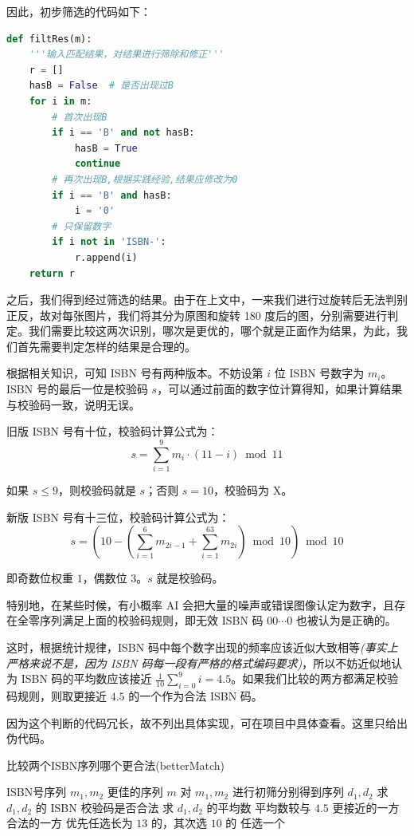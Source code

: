 \documentclass{ctexart}
\begin{document}
因此，初步筛选的代码如下：
\begin{lstlisting}[language=python]
def filtRes(m):
    '''输入匹配结果，对结果进行筛除和修正'''
    r = []
    hasB = False  # 是否出现过B
    for i in m:
        # 首次出现B
        if i == 'B' and not hasB:
            hasB = True
            continue
        # 再次出现B,根据实践经验,结果应修改为0
        if i == 'B' and hasB:
            i = '0'
        # 只保留数字
        if i not in 'ISBN-':
            r.append(i)
    return r
\end{lstlisting}

之后，我们得到经过筛选的结果。由于在上文中，一来我们进行过旋转后无法判别正反，故对每张图片，我们将其分为原图和旋转 180 度后的图，分别需要进行判定。我们需要比较这两次识别，哪次是更优的，哪个就是正面作为结果，为此，我们首先需要判定怎样的结果是合理的。

根据相关知识，可知 ISBN 号有两种版本。不妨设第 $i$ 位 ISBN 号数字为 $m_i$。ISBN 号的最后一位是校验码 $s$，可以通过前面的数字位计算得知，如果计算结果与校验码一致，说明无误。

旧版 ISBN 号有十位，校验码计算公式为：
\[s=\sum_{i=1}^9m_i\cdot(11-i)\bmod{11}\]

如果 $s\le 9$，则校验码就是 $s$；否则 $s=10$，校验码为 X。

新版 ISBN 号有十三位，校验码计算公式为：
\[s=(10-(\sum_{i=1}^6m_{2i-1}+\sum_{i=1}^63m_{2i})\bmod 10)\bmod{10}\]

即奇数位权重 $1$，偶数位 $3$。$s$ 就是校验码。

特别地，在某些时候，有小概率 AI 会把大量的噪声或错误图像认定为数字，且存在全零序列满足上面的校验码规则，即无效 ISBN 码 $00\cdots 0$ 也被认为是正确的。

这时，根据统计规律，ISBN 码中每个数字出现的频率应该近似大致相等\textit{(事实上严格来说不是，因为 ISBN 码每一段有严格的格式编码要求)}，所以不妨近似地认为 ISBN 码的平均数应该接近 $\frac{1}{10}\sum_{i=0}^9i=4.5$。如果我们比较的两方都满足校验码规则，则取更接近 $4.5$ 的一个作为合法 ISBN 码。

因为这个判断的代码冗长，故不列出具体实现，可在项目中具体查看。这里只给出伪代码。
\begin{algorithm}
    \caption{比较两个ISBN序列哪个更合法(betterMatch)}
    \label{betterMatch}
    \renewcommand{\algorithmicrequire}{\textbf{输入:}}
    \renewcommand{\algorithmicensure}{\textbf{输出:}}
    \begin{algorithmic}
        \REQUIRE ISBN号序列 $m_1,m_2$
        \ENSURE 更佳的序列 $m$
        \STATE 对 $m_1,m_2$ 进行初筛分别得到序列 $d_1,d_2$
        \STATE 求 $d_1,d_2$ 的 ISBN 校验码是否合法
        \STATE 求 $d_1,d_2$ 的平均数
        \RETURN 平均数较与 $4.5$ 更接近的一方
        \ELSE
            \RETURN 合法的一方
            \ELSE
                \RETURN 优先任选长为 $13$ 的，其次选 $10$ 的
                \ELSE
                \RETURN 任选一个
                \ENDIF
            \ENDIF
        \ENDIF
    \end{algorithmic}
\end{algorithm}
\end{document}
